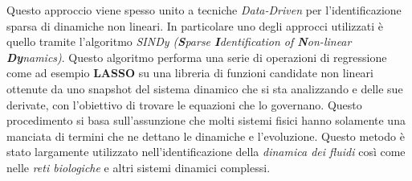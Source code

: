 Questo approccio viene spesso unito a tecniche \emph{Data-Driven} \cite{datadrivendiffeq} per l'identificazione
sparsa di dinamiche non lineari. In particolare uno degli approcci utilizzati 
è quello tramite l'algoritmo \emph{SINDy (\textbf{S}parse \textbf{I}dentification of \textbf{N}on-linear \textbf{Dy}namics)}. 
Questo algoritmo performa una serie di operazioni di regressione come 
ad esempio \textbf{LASSO} su una libreria di funzioni candidate non lineari ottenute
da uno snapshot del sistema dinamico che si sta analizzando e delle sue derivate, 
con l'obiettivo di trovare le equazioni che lo governano. Questo procedimento 
si basa sull'assunzione che molti sistemi fisici hanno solamente una manciata di 
termini che ne dettano le dinamiche e l'evoluzione. Questo metodo è stato largamente
utilizzato nell'identificazione della \emph{dinamica dei fluidi} così come
nelle \emph{reti biologiche} e altri sistemi dinamici complessi.